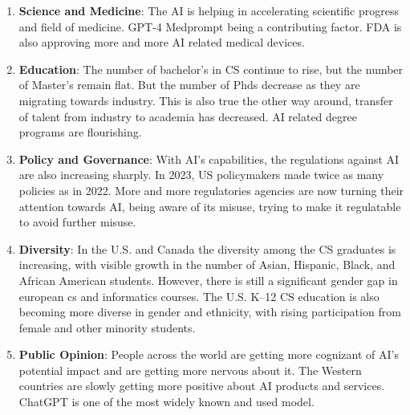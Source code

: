 \documentclass{article}
\begin{document}
\begin{enumerate}
  \item \textbf{Science and Medicine}: The AI is helping in accelerating scientific progress and field of medicine. GPT-4 Medprompt being a contributing factor. FDA is also approving more and more AI related medical devices.
  \item \textbf{Education}: The number of bachelor’s in CS continue to rise, but the number of Master’s remain flat. But the number of Phds decrease as they are migrating towards industry. This is also true the other way around, transfer of talent from industry to academia has decreased. AI related degree programs are flourishing. 	
  \item \textbf{Policy and Governance}: With AI’s capabilities, the regulations against AI are also increasing sharply. In 2023, US policymakers made twice as many policies as in 2022. More and more regulatories agencies are now turning their attention towards AI, being aware of its misuse, trying to make it regulatable to avoid further misuse.
  \item \textbf{Diversity}: In the U.S. and Canada the diversity among  the CS graduates is increasing, with visible growth in the number of Asian, Hispanic, Black, and African American students. However, there is still a significant gender gap in european cs and informatics courses. The U.S. K–12 CS education is also becoming more diverse in gender and ethnicity, with rising participation from female and other minority students.
  \item \textbf{Public Opinion}: People across the world are getting more cognizant of AI’s potential impact and are getting more nervous about it. The Western countries are slowly getting more positive about AI products and services. ChatGPT is one of the most widely known and used model.
\end{enumerate}



\end{document}
